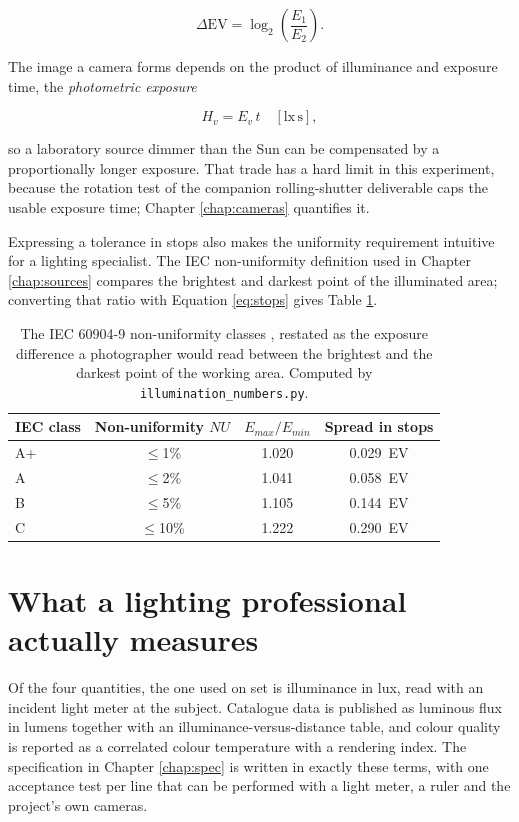 \begin{equation}
\Delta\mathrm{EV} = \log_2\!\left(\frac{E_1}{E_2}\right) .
\label{eq:stops}
\end{equation}

The image a camera forms depends on the product of illuminance and exposure time, the \emph{photometric exposure}

\begin{equation}
H_v = E_v \, t \quad \mathrm{[lx\,s]} ,
\label{eq:exposure}
\end{equation}

so a laboratory source dimmer than the Sun can be compensated by a proportionally longer exposure. That trade has a hard limit in this experiment, because the rotation test of the companion rolling-shutter deliverable caps the usable exposure time; Chapter \ref{chap:cameras} quantifies it.

Expressing a tolerance in stops also makes the uniformity requirement intuitive for a lighting specialist. The IEC non-uniformity definition used in Chapter \ref{chap:sources} compares the brightest and darkest point of the illuminated area; converting that ratio with Equation \ref{eq:stops} gives Table \ref{tab:nu-stops}.

\begin{table}[!ht]
\centering
\small
\caption[IEC non-uniformity classes expressed in photographic stops]{The IEC 60904-9 non-uniformity classes \cite{iec60904_9_2020}, restated as the exposure difference a photographer would read between the brightest and the darkest point of the working area. Computed by \texttt{illumination\_numbers.py}.}
\label{tab:nu-stops}
\begin{tabular}{lccc}
\toprule
\textbf{IEC class} & \textbf{Non-uniformity $NU$} & \textbf{$E_{max}/E_{min}$} & \textbf{Spread in stops} \\
\midrule
A+ & $\leq$1\%  & 1.020 & 0.029~EV \\
A  & $\leq$2\%  & 1.041 & 0.058~EV \\
B  & $\leq$5\%  & 1.105 & 0.144~EV \\
C  & $\leq$10\% & 1.222 & 0.290~EV \\
\bottomrule
\end{tabular}
\end{table}

\section{What a lighting professional actually measures}

Of the four quantities, the one used on set is illuminance in lux, read with an incident light meter at the subject. Catalogue data is published as luminous flux in lumens together with an illuminance-versus-distance table, and colour quality is reported as a correlated colour temperature with a rendering index. The specification in Chapter \ref{chap:spec} is written in exactly these terms, with one acceptance test per line that can be performed with a light meter, a ruler and the project's own cameras.
